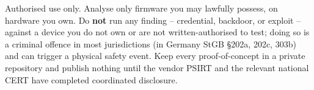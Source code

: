 \documentclass[11pt,a4paper]{article}
\begin{document}
\begin{warnbox}
Authorised use only. Analyse only firmware you may lawfully possess,
on hardware you own. Do \textbf{not} run any finding -- credential,
backdoor, or exploit -- against a device you do not own or are not
written-authorised to test; doing so is a criminal offence in most
jurisdictions (in Germany StGB \S 202a, 202c, 303b) and can trigger a
physical safety event. Keep every proof-of-concept in a private
repository and publish nothing until the vendor PSIRT and the relevant
national CERT have completed coordinated disclosure.
\end{warnbox}
\end{document}
